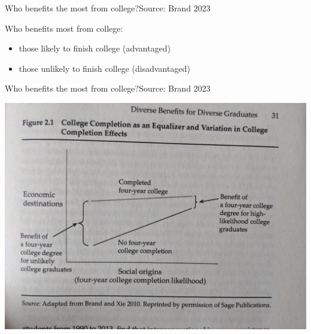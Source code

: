 \documentclass{beamer}
\renewcommand\P{\text{P}}
\begin{document}

\begin{frame}{Who benefits the most from college?}{Source: Brand 2023}

Who benefits most from college:

\begin{itemize}
\item those likely to finish college \hfill (advantaged)
\item those unlikely to finish college \hfill (disadvantaged)
\end{itemize}

\end{frame}

\begin{frame}{Who benefits the most from college?}{Source: Brand 2023}

\includegraphics[width = .8\textwidth]{figures/brand_p31}

\end{frame}
\end{document}
